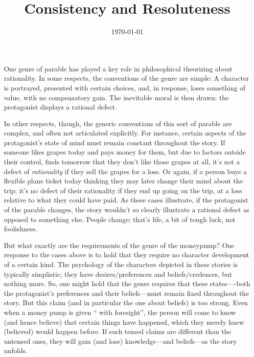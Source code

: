 \documentclass[11pt]{article}
\title{Consistency and Resoluteness}
\author{}
\date{\today}
\theoremstyle{definition}
\theoremstyle{definition}
\begin{document}
\maketitle

One genre of parable has played a key role in philosophical theorizing about rationality. In some respects, the conventions of the genre are simple: A character is portrayed, presented with certain choices, and, in response, loses something of value, with no compensatory gain. The inevitable moral is then drawn: the protagonist displays a rational defect.

In other respects, though, the generic conventions of this sort of parable are complex, and often not articulated explicitly. For instance, certain aspects of the protagonist's state of mind must remain constant throughout the story. If someone likes grapes today and pays money for them, but due to factors outside their control, finds tomorrow that they don't like those grapes at all, it's not a defect of \emph{rationality} if they sell the grapes for a loss. Or again, if a person buys a flexible plane ticket today thinking they may later change their mind about the trip; it's no defect of their rationality if they end up going on the trip, at a loss relative to what they could have paid. As these cases illustrate, if the protagonist of the parable changes, the story wouldn't so clearly illustrate a rational defect as opposed to something else. People change; that's life, a bit of tough luck, not foolishness.

But what exactly are the requirements of the genre of the moneypump? One response to the cases above is to hold that they require no character development of a certain kind. The psychology of the characters depicted in these stories is typically simplistic; they have desires/preferences and beliefs/credences, but nothing more. So, one might hold that the genre requires that these states----both the protagonist's preferences and their beliefs---must remain fixed throughout the story. But this claim (and in particular the one about beliefs) is too strong. Even when a money pump is given `` with foresight'', the person will come to know (and hence believe) that certain things have happened, which they merely knew (believed) would happen before. If such tensed claims are different than the untensed ones, they will gain (and lose) knowledge---and beliefs---as the story unfolds. 
\end{document}
